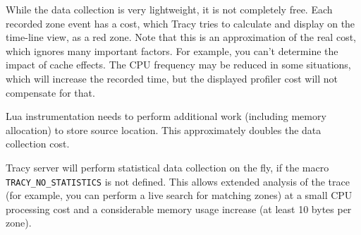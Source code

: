 \documentclass[hidelinks,titlepage,a4paper]{article}
\begin{document}
While the data collection is very lightweight, it is not completely free. Each recorded zone event has a cost, which Tracy tries to calculate and display on the time-line view, as a red zone. Note that this is an approximation of the real cost, which ignores many important factors. For example, you can't determine the impact of cache effects. The CPU frequency may be reduced in some situations, which will increase the recorded time, but the displayed profiler cost will not compensate for that.

Lua instrumentation needs to perform additional work (including memory allocation) to store source location. This approximately doubles the data collection cost.

Tracy server will perform statistical data collection on the fly, if the macro \texttt{TRACY\_NO\_STATISTICS} is not defined. This allows extended analysis of the trace (for example, you can perform a live search for matching zones) at a small CPU processing cost and a considerable memory usage increase (at least 10 bytes per zone).
\end{document}
